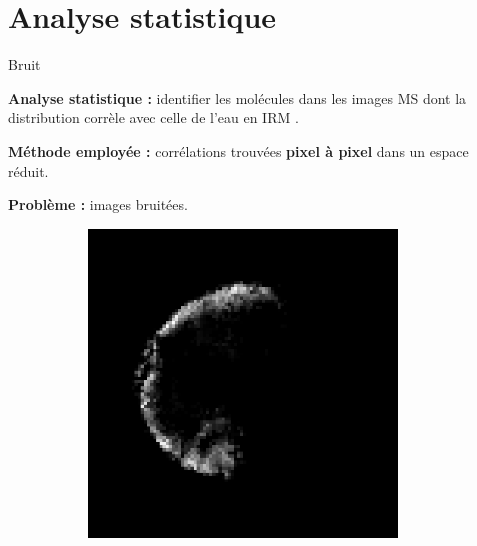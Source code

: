\documentclass[10pt]{beamer}
\begin{document}
\section{Analyse statistique}

\begin{frame}{Bruit}

  \textbf{Analyse statistique :} identifier les molécules dans les images MS dont la distribution corrèle avec celle de l'eau en IRM \vspace{0.2cm}.

  \textbf{Méthode employée :} corrélations trouvées \textbf{pixel à pixel} dans un espace réduit.

  \textbf{Problème :} images bruitées.

  \begin{figure}[ht]
    \centering
    \begin{subfigure}[t]{0.33\textwidth}
      \centering
      \includegraphics[width=0.9\textwidth]{fig/nmf_components_0}
      \caption{}
      \label{subfig:cluster0}
    \end{subfigure}%
     \begin{subfigure}[t]{0.33\textwidth}
      \centering

\end{subfigure}
\end{figure}
\end{frame}
\end{document}
